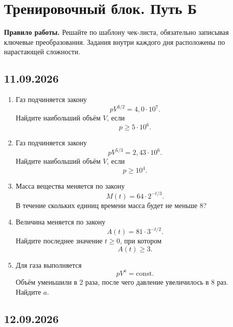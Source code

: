 \documentclass[a4paper,12pt]{article}
\newcommand{\sect}[1]{%
  \section*{\color{darkaccent}#1}%
}
\newcommand{\subsect}[1]{%
  \subsection*{\color{accent}#1}%
}
\begin{document}

\clearpage

\sect{Тренировочный блок. Путь Б}

\textbf{Правило работы.}
Решайте по шаблону чек-листа,
обязательно записывая ключевые преобразования.
Задания внутри каждого дня расположены по нарастающей сложности.


\subsect{11.09.2026}

\begin{enumerate}[label=\arabic*)]

  \item
  Газ подчиняется закону
  \[
  pV^{3/2}=4{,}0\cdot10^7.
  \]
  Найдите наибольший объём $V$, если
  \[
  p\ge5\cdot10^6.
  \]

  \item
  Газ подчиняется закону
  \[
  pV^{5/3}=2{,}43\cdot10^6.
  \]
  Найдите наибольший объём $V$, если
  \[
  p\ge10^4.
  \]

  \item
  Масса вещества меняется по закону
  \[
  M(t)=64\cdot2^{-t/3}.
  \]
  В течение скольких единиц времени масса будет не меньше $8$?

  \item
  Величина меняется по закону
  \[
  A(t)=81\cdot3^{-t/2}.
  \]
  Найдите последнее значение $t\ge0$, при котором
  \[
  A(t)\ge3.
  \]

  \item
  Для газа выполняется
  \[
  pV^a=\mathrm{const}.
  \]
  Объём уменьшили в $2$ раза,
  после чего давление увеличилось в $8$ раз.
  Найдите $a$.

\end{enumerate}


\subsect{12.09.2026}
\end{document}
